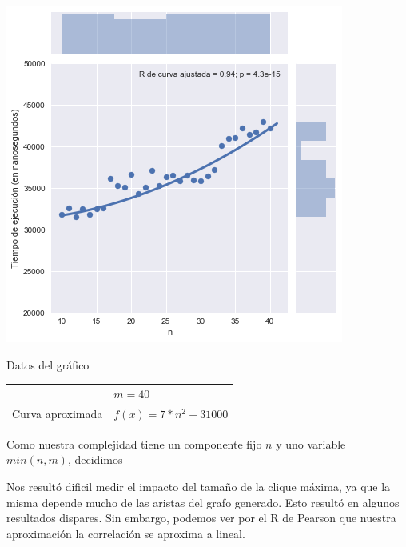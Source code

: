 \begin{minipage}{0.49\textwidth}
    \hfill
    \includegraphics[scale=0.55]{img/greedy-n-hi.png}

    \begin{center}
        Datos del gráfico

        \begin{tabular}{ | l l |}
            \hline
             & $m = 40$ \\ 
            Curva aproximada & $f(x) = 7 * n^2 + 31000$ \\
            \hline
        \end{tabular}
    \end{center}
\end{minipage}

Como nuestra complejidad tiene un componente fijo $n$ y uno variable $min(n,m)$, decidimos

Nos resultó dificil medir el impacto del tamaño de la clique máxima, ya que la misma depende mucho de las aristas del grafo generado. Esto resultó en algunos resultados dispares. Sin embargo, podemos ver por el R de Pearson que nuestra aproximación  la correlación se aproxima a lineal.

